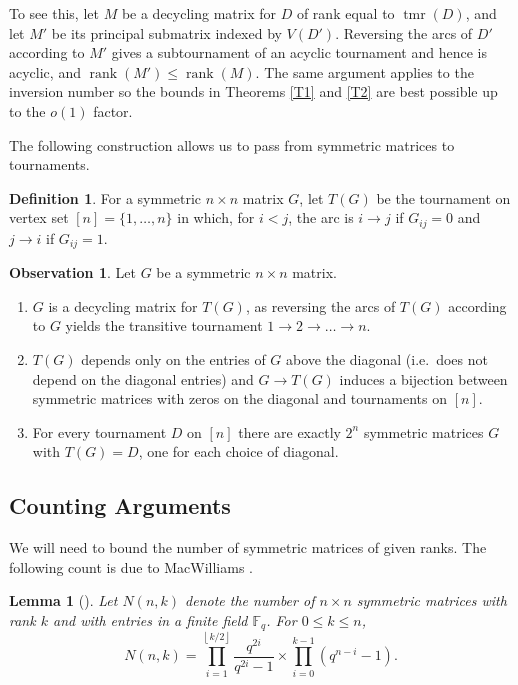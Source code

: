\documentclass[10pt,a4paper]{amsart}
\numberwithin{equation}{section}
\theoremstyle{plain}
\newtheorem{lemma}[thm]{Lemma}
\theoremstyle{remark}
\theoremstyle{definition}
\newtheorem{defn}[thm]{Definition}
\newtheorem{obs}[thm]{Observation}
\newcommand{\tmr}{\operatorname{tmr}}
\newcommand{\rank}{\operatorname{rank}}
\begin{document}
To see this, let $M$ be a decycling matrix for $D$ of rank equal to $\tmr(D)$, and let $M'$ be its principal submatrix indexed by $V(D')$. Reversing the arcs of $D'$ according to $M'$ gives a subtournament of an acyclic tournament and hence is acyclic, and $\rank(M') \leq \rank(M)$. The same argument applies to the inversion number so the bounds in Theorems \ref{T1} and \ref{T2} are best possible up to the $o(1)$ factor.

The following construction allows us to pass from symmetric matrices to tournaments.

\begin{defn}
    For a symmetric $n \times n$ matrix $G$, let $T(G)$ be the tournament on vertex set $[n] = \{1,\dots,n\}$ in which, for $i < j$, the arc is $i \to j$ if $G_{ij} = 0 $ and $j \to i$ if $G_{ij}=1$.
\end{defn}

\begin{obs} \label{G1}
    Let  $G$ be a symmetric $n \times n$ matrix.
    \begin{enumerate}
        \item $G$ is a decycling matrix for $T(G)$, as reversing the arcs of $T(G)$ according to $G$ yields the transitive tournament $1\to2\to\dots\to n$.
        \item $T(G)$ depends only on the entries of $G$ above the diagonal (i.e.~does not depend on the diagonal entries) and $G \to T(G)$ induces a bijection between symmetric matrices with zeros on the diagonal and tournaments on $[n]$.
        \item For every tournament $D$ on $[n]$ there are exactly $2^n$ symmetric matrices $G$ with $T(G) = D$, one for each choice of diagonal.  \label{item:2^n diagonal choices}
    \end{enumerate}
\end{obs}


\bigskip

\subsection{Counting Arguments}
We will need to bound the number of symmetric matrices of given ranks. The following count is due to MacWilliams \cite{MacW}. 

\begin{lemma}[{\cite[Theorem 2]{MacW}}] \label{lem:Mc1}
    Let $N(n,k)$ denote the number of $n \times n$  symmetric matrices with rank $k$ and with entries in a finite field $\mathbb{F}_q$. For $0 \leq k \le n$,
    \begin{equation*}
        N(n,k) = \prod_{i=1}^{\left \lfloor{k/2}\right \rfloor } \frac{q^{2i}}{q^{2i}-1} \times \prod_{i=0}^{k-1} (q^{n-i}-1).
    \end{equation*}
\end{lemma}
\end{document}
